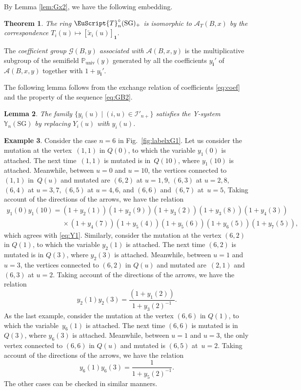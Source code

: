 \documentclass[pdftex]{sigma}
\numberwithin{equation}{section}
\newtheorem{Theorem}{Theorem}[section]
\newtheorem{Lemma}[Theorem]{Lemma}
\theoremstyle{definition}
\newtheorem{Example}[Theorem]{Example}
\begin{document}
By Lemma \ref{lem:Gx2}, we have the following embedding.
\begin{Theorem}
\label{thm:GTiso}
The ring $\EuScript{T}^{\circ}_{n}(\mathrm{SG})_+$ is isomorphic to
$\mathcal{A}_T(B,x)$ by the correspondence
$T_i(u)\mapsto [\tilde{x}_i(u)]_{\mathbf{1}}$.
\end{Theorem}



The {\em coefficient group $\mathcal{G}(B,y)$
associated with $\mathcal{A}(B,x,y)$}
is the multiplicative subgroup of
the semif\/ield $\mathbb{P}_{\mathrm{univ}}(y)$ generated by all
the coef\/f\/icients $y_{\mathbf{i}}'$ of $\mathcal{A}(B,x,y)$
together with $1+y_{\mathbf{i}}'$.

The following lemma follows from the exchange relation of
coef\/f\/icients \eqref{eq:coef} and the property of the sequence
\eqref{eq:GB2}.


\begin{Lemma}
\label{lem:Gy2}
The family $\{ y_i(u)
\mid (i,u)\in \mathcal{I}'_{n+}\}$
satisfies the Y-system $\mathbb{Y}_{n}(\mathrm{SG})$
by replacing $Y_i(u)$ with $y_i(u)$.
\end{Lemma}

\begin{Example}
Consider the case $n=6$ in Fig.~\ref{fig:labelxG1}.
Let us consider the mutation at the vertex~$(1,1)$ in $Q(0)$,
to which  the variable $y_1(0)$ is attached.
The next time~$(1,1)$ is mutated is in~$Q(10)$,
where $y_1(10)$ is attached.
Meanwhile, between $u=0$ and $u=10$,
the vertices connected to $(1,1)$ in~$Q(u)$ and mutated
are
$(6,2)$ at $u=1,9$, $(6,3)$ at $u=2,8$, $(6,4)$ at $u=3,7$,
$(6,5)$ at $u=4,6$, and  $(6,6)$ and $(6,7)$ at~$u=5$,
Taking account of the directions of the arrows,
we have the relation
\begin{gather*}
y_1(0)y_1(10)=
(1+y_2(1))(1+y_2(9))(1+y_3(2))(1+y_3(8)) (1+y_4(3))\\
\phantom{y_1(0)y_1(10)=}{} \times (1+y_4(7))
(1+ y_5(4))(1+y_5(6)) (1+y_6(5))(1+y_7(5)),
\end{gather*}
which agrees with
\eqref{eq:Y1}.
Similarly, consider the mutation at the vertex $(6,2)$ in $Q(1)$,
to which  the variable $y_2(1)$ is attached.
The next time $(6,2)$ is mutated is in $Q(3)$,
where $y_2(3)$ is attached.
Meanwhile, between $u=1$ and $u=3$,
the vertices connected to $(6,2)$ in $Q(u)$ and mutated
are~$(2,1)$ and~$(6,3)$ at $u=2$.
Taking account of the directions of the arrows,
we have the relation
\[
y_2(1)y_2(3) =
\frac{(1+y_1(2))}{1+y_3(2)^{-1}}.
\]
As the last example, consider the mutation at the vertex $(6,6)$ in $Q(1)$,
to which  the variable~$y_6(1)$ is attached.
The next time $(6,6)$ is mutated is in $Q(3)$,
where $y_6(3)$ is attached.
Meanwhile, between $u=1$ and $u=3$,
the only vertex connected to $(6,6)$ in $Q(u)$ and mutated
is  $(6,5)$ at~$u=2$.
Taking account of the directions of the arrows,
we have the relation
\[
y_6(1)y_6(3) =
\frac{1}{1+y_5(2)^{-1}}.
\]
The other cases can be checked in similar manners.
\end{Example}
\end{document}
